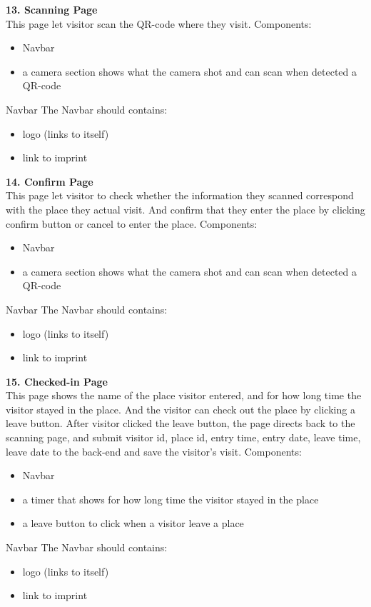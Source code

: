 \documentclass{article}
\begin{document}
\textbf{13. Scanning Page}\\
This page let visitor scan the QR-code where they visit.
Components:\\
\begin{itemize}
	\item Navbar
	\item a camera section shows what the camera shot and can scan when detected a QR-code
\end{itemize}
Navbar
The Navbar should contains:
\begin{itemize}
	\item logo (links to itself)
	\item link to imprint
\end{itemize}

\textbf{14. Confirm Page}\\
This page let visitor to check whether the information they scanned correspond with the place they actual visit.
And confirm that they enter the place by clicking confirm button or cancel to enter the place.
Components:\\
\begin{itemize}
	\item Navbar
	\item a camera section shows what the camera shot and can scan when detected a QR-code
\end{itemize}
Navbar
The Navbar should contains:
\begin{itemize}
	\item logo (links to itself)
	\item link to imprint
\end{itemize}

\textbf{15. Checked-in Page}\\
This page shows the name of the place visitor entered, and for how long time the visitor stayed in the place.
And the visitor can check out the place by clicking a leave button. After visitor clicked the leave button, 
the page directs back to the scanning page, and submit visitor id, place id, entry time, entry date, leave time,
leave date to the back-end and save the visitor's visit.
Components:\\
\begin{itemize}
	\item Navbar
	\item a timer that shows for how long time the visitor stayed in the place
	\item a leave button to click when a visitor leave a place
\end{itemize}
Navbar
The Navbar should contains:
\begin{itemize}
	\item logo (links to itself)
	\item link to imprint
\end{itemize}
\end{document}
